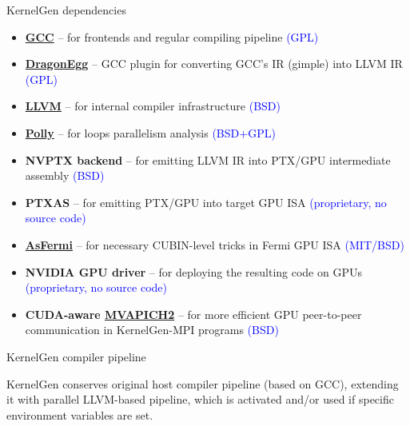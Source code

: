 \documentclass[aspectratio=169]{beamer}
\begin{document}
\begin{frame}[fragile]{{KernelGen} dependencies}

\begin{itemize}
\item \href{http://gcc.gnu.org/}{\bf GCC} -- for frontends and regular compiling pipeline \textcolor{blue}{(GPL)}
\item \href{http://dragonegg.llvm.org/}{\bf DragonEgg} -- GCC plugin for converting GCC's IR (gimple) into LLVM IR \textcolor{blue}{(GPL)}
\item \href{http://llvm.org/}{\bf LLVM} -- for internal compiler infrastructure \textcolor{blue}{(BSD)}
\item \href{http://polly.llvm.org/}{\bf Polly} -- for loops parallelism analysis \textcolor{blue}{(BSD+GPL)}
\item {\bf NVPTX backend} -- for emitting LLVM IR into PTX/GPU intermediate assembly \textcolor{blue}{(BSD)}
\item {\bf PTXAS} -- for emitting PTX/GPU into target GPU ISA \textcolor{blue}{(proprietary, no source code)}
\item \href{http://code.google.com/p/asfermi/}{\bf AsFermi} -- for necessary CUBIN-level tricks in Fermi GPU ISA \textcolor{blue}{(MIT/BSD)}
\item {\bf NVIDIA GPU driver} -- for deploying the resulting code on GPUs \textcolor{blue}{(proprietary, no source code)}
\item {\bf CUDA-aware \href{http://mvapich.cse.ohio-state.edu/overview/mvapich2/}{MVAPICH2}} -- for more efficient GPU peer-to-peer communication in {KernelGen}-{MPI} programs \textcolor{blue}{(BSD)}
\end{itemize}

\vskip 5pt

\end{frame}



\begin{frame}[fragile]{{KernelGen compiler pipeline}}

{KernelGen} conserves original host compiler pipeline (based on GCC), extending it with parallel LLVM-based pipeline, which is activated and/or used if specific environment variables are set.
\vskip 10pt
\setlength{\fboxsep}{0pt}%
\setlength{\fboxrule}{0.25pt}%
\begin{center}
\end{center}

\end{frame}
\end{document}
